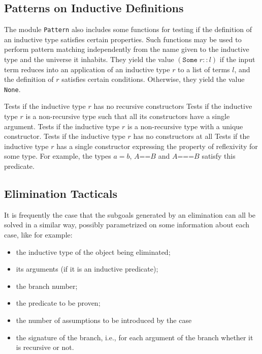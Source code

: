 \subsection{Patterns on Inductive Definitions}

The module \texttt{Pattern} also includes some functions for testing
if the definition of an inductive type satisfies certain
properties. Such functions may be used to perform pattern matching
independently from the name given to the inductive type and the
universe it inhabits.  They yield the value $(\texttt{Some}\;r::l)$ if
the input term reduces into an application of an inductive type $r$ to
a list of terms $l$, and the definition of $r$ satisfies certain
conditions. Otherwise, they yield the value \texttt{None}.

\begin{description}
    {Tests if the inductive type $r$ has no recursive constructors}
    {Tests if the inductive type $r$ is a non-recursive type
     such that all its constructors have a single argument.}
    {Tests if the inductive type $r$ is a non-recursive type
     with a unique constructor.}
    {Tests if the inductive type $r$ has no constructors at all}
    {Tests if the inductive type $r$ has a single constructor
     expressing the property of reflexivity for some type. For
     example, the types $a=b$, $A\mbox{==}B$ and $A\mbox{===}B$ satisfy
     this predicate.}
\end{description}

\subsection{Elimination Tacticals}

It is frequently the case that the subgoals generated by an
elimination can all be solved in a similar way, possibly parametrized
on some information about each case, like for example:
\begin{itemize}
\item the inductive type of the object being eliminated;
\item its arguments (if it is an inductive predicate);
\item the branch number;
\item the predicate to be proven;
\item the number of assumptions to be introduced by the case
\item the signature of the branch, i.e., for each argument of
the branch whether it is recursive or not.
\end{itemize}

